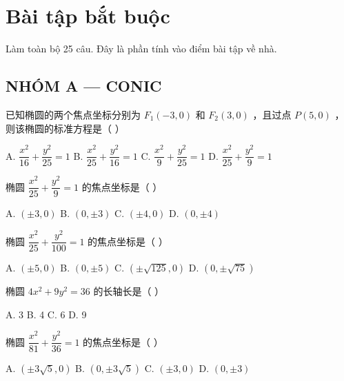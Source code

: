 \documentclass[11pt, a4paper]{article}
\begin{document}

\section{Bài tập bắt buộc}

Làm toàn bộ 25 câu. Đây là phần tính vào điểm bài tập về nhà.

\subsection*{NHÓM A — CONIC}

\begin{baitap}[1]
已知椭圆的两个焦点坐标分别为 $F_1(-3,0)$ 和 $F_2(3,0)$ ，且过点 $P(5,0)$ ，则该椭圆的标准方程是（ ）
\par\vspace{3pt}
\noindent A. $\dfrac{x^2}{16} + \dfrac{y^2}{25} = 1$ \quad B. $\dfrac{x^2}{25} + \dfrac{y^2}{16} = 1$ \quad C. $\dfrac{x^2}{9} + \dfrac{y^2}{25} = 1$ \quad D. $\dfrac{x^2}{25} + \dfrac{y^2}{9} = 1$
\end{baitap}

\begin{baitap}[2]
椭圆 $\dfrac{x^2}{25} + \dfrac{y^2}{9} = 1$ 的焦点坐标是（ ）
\par\vspace{3pt}
\noindent A. $(\pm 3, 0)$ \quad B. $(0, \pm 3)$ \quad C. $(\pm 4, 0)$ \quad D. $(0, \pm 4)$
\end{baitap}

\begin{baitap}[3]
椭圆 $\dfrac{x^2}{25} + \dfrac{y^2}{100} = 1$ 的焦点坐标是（ ）
\par\vspace{3pt}
\noindent A. $(\pm 5, 0)$ \quad B. $(0, \pm 5)$ \quad C. $(\pm\sqrt{125}, 0)$ \quad D. $(0, \pm\sqrt{75})$
\end{baitap}

\begin{baitap}[4]
椭圆 $4x^2 + 9y^2 = 36$ 的长轴长是（ ）
\par\vspace{3pt}
\noindent A. 3 \quad B. 4 \quad C. 6 \quad D. 9
\end{baitap}

\begin{baitap}[5]
椭圆 $\dfrac{x^2}{81} + \dfrac{y^2}{36} = 1$ 的焦点坐标是（ ）
\par\vspace{3pt}
\noindent A. $(\pm 3\sqrt{5}, 0)$ \quad B. $(0, \pm 3\sqrt{5})$ \quad C. $(\pm 3, 0)$ \quad D. $(0, \pm 3)$
\end{baitap}
\end{document}
